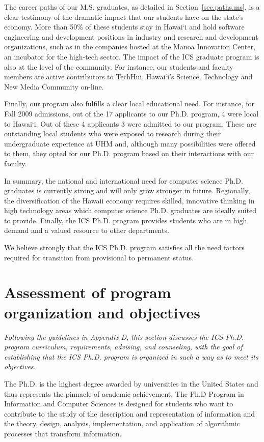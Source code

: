 \documentclass[12pt]{article}
\begin{document}
The career paths of our M.S. graduates, as detailed in
Section~\ref{sec.paths.ms}, is a clear testimony of the dramatic
impact that our students have on the state's economy. More than 50\%
of these students stay in Hawai`i and hold software engineering and
development positions in industry and research and development
organizations, such as in the companies hosted at the Manoa Innovation
Center, an incubator for the high-tech sector.  The impact of the ICS
graduate program is also at the level of the community.  For instance, our
students and faculty members are active contributors to TechHui,
Hawai`i's Science, Technology and New Media Community on-line.

Finally, our program also fulfills a clear local educational need. For
instance, for Fall 2009 admissions, out of the 17 applicants to our
Ph.D. program, 4 were local to Hawai`i.  Out of these 4 applicants 3
were admitted to our program. These are outstanding local students who
were exposed to research during their undergraduate experience at UHM
and, although many possibilities were offered to them, they opted for
our Ph.D. program based on their interactions with our faculty.

In summary, the national and international need for computer science
Ph.D. graduates is currently strong and will only grow stronger in future.
Regionally, the diversification of the Hawaii economy requires skilled,
innovative thinking in high technology areas which computer science
Ph.D. graduates are ideally suited to provide.  Finally, the ICS
Ph.D. program provides students who are in high demand and a valued
resource to other departments.   

We believe strongly that the ICS Ph.D. program satisfies all the need
factors required for transition from provisional to permanent status.

\section{Assessment of program organization and objectives}

{\em Following the guidelines in Appendix D, this section discusses the ICS
  Ph.D. program curriculum, requirements, advising, and counseling, with
  the goal of establishing that the ICS Ph.D. program is organized in such
  a way as to meet its objectives. }

The Ph.D. is the highest degree awarded by universities in the United
States and thus represents the pinnacle of academic achievement.  The Ph.D
Program in Information and Computer Sciences is designed for students who
want to contribute to the study of the description and representation of
information and the theory, design, analysis, implementation, and
application of algorithmic processes that transform information.
\end{document}
